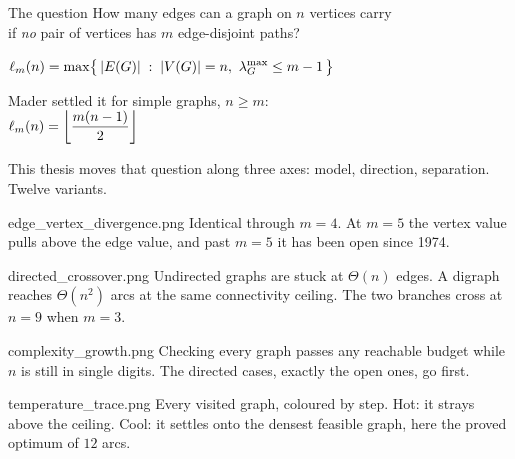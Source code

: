 \documentclass[aspectratio=1610,11pt]{beamer}
\begin{document}

\begin{frame}{The question}
\vfill
\centering
{\large How many edges can a graph on $n$ vertices carry}\\[2pt]
{\large if \emph{no} pair of vertices has $m$ edge-disjoint paths?}

\vspace{16pt}
{\color{KULblauw3b}\Large $\displaystyle \ell_m(n)=\max\bigl\{\,|E(G)| \;:\; |V(G)|=n,\ \lambda^{\max}_G\le m-1\,\bigr\}$}

\vspace{18pt}
\begin{minipage}{0.62\textwidth}
\centering
{\color{black!45}\small Mader settled it for simple graphs, $n\ge m$:}\\[6pt]
{\color{KULblauw1}\Large $\displaystyle \ell_m(n)=\left\lfloor \frac{m(n-1)}{2}\right\rfloor$}
\end{minipage}

\vspace{18pt}
{\footnotesize\color{black!60} This thesis moves that question along three axes: model, direction, separation. Twelve variants.}
\vfill
\end{frame}

  {edge_vertex_divergence.png}
  {Identical through $m=4$. At $m=5$ the vertex value pulls above the edge value, and past $m=5$ it has been open since 1974.}

  {directed_crossover.png}
  {Undirected graphs are stuck at $\Theta(n)$ edges. A digraph reaches $\Theta(n^2)$ arcs at the same connectivity ceiling. The two branches cross at $n=9$ when $m=3$.}

  {complexity_growth.png}
  {Checking every graph passes any reachable budget while $n$ is still in single digits. The directed cases, exactly the open ones, go first.}

  {temperature_trace.png}
  {Every visited graph, coloured by step. Hot: it strays above the ceiling. Cool: it settles onto the densest feasible graph, here the proved optimum of $12$ arcs.}
\end{document}
